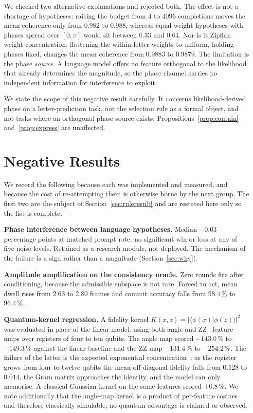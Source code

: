 \documentclass[conference]{IEEEtran}
\begin{document}
We checked two alternative explanations and rejected both. The effect is not a
shortage of hypotheses: raising the budget from $4$ to $4096$ completions moves
the mean coherence only from $0.982$ to $0.988$, whereas equal-weight
hypotheses with phases spread over $[0,\pi]$ would sit between $0.33$ and
$0.64$. Nor is it Zipfian weight concentration:
flattening the within-letter weights to uniform, holding phases fixed, changes
the mean coherence from $0.9883$ to $0.9879$. The limitation is the phase
\emph{source}. A language model offers no feature orthogonal to the likelihood
that already determines the magnitude, so the phase channel carries no
independent information for interference to exploit.

We state the scope of this negative result carefully. It concerns
likelihood-derived phase on a letter-prediction task, not the selection rule as
a formal object, and not tasks where an orthogonal phase source exists.
Propositions~\ref{prop:contain} and~\ref{prop:express} are unaffected.

\section{Negative Results}

We record the following because each was implemented and measured, and because
the cost of re-attempting them is otherwise borne by the next group. The first
two are the subject of Section~\ref{sec:ruleresult} and are restated here only
so the list is complete.

\textbf{Phase interference between language hypotheses.} Median $-0.03$
percentage points at matched prompt rate; no significant win or loss at any of
five noise levels. Retained as a research module, not deployed. The mechanism of
the failure is a sign rather than a magnitude (Section~\ref{sec:why}).

\textbf{Amplitude amplification on the consistency oracle.} Zero rounds fire
after conditioning, because the admissible subspace is not rare. Forced to act,
mean dwell rises from $2.63$ to $2.80$ frames and commit accuracy falls from
$98.4\,\%$ to $96.4\,\%$.

\textbf{Quantum-kernel regression.} A fidelity kernel
$K(x,z)=|\langle\phi(x)|\phi(z)\rangle|^2$ was evaluated in place of the linear
model, using both angle and ZZ~\cite{ref15} feature maps over registers of four
to ten qubits. The angle map scored $-143.0\,\%$ to $-149.3\,\%$ against the
linear baseline and the ZZ map $-131.4\,\%$ to $-254.2\,\%$. The
failure of the latter is the expected exponential
concentration~\cite{ref16}: as the register grows from four to twelve qubits the
mean off-diagonal fidelity falls from $0.128$ to $0.014$, the Gram matrix approaches
the identity, and the model can only memorise. A classical Gaussian kernel on the
same features scored $+0.8\,\%$. We note additionally that the angle-map kernel
is a product of per-feature cosines and therefore classically simulable; no
quantum advantage is claimed or observed.
\end{document}
